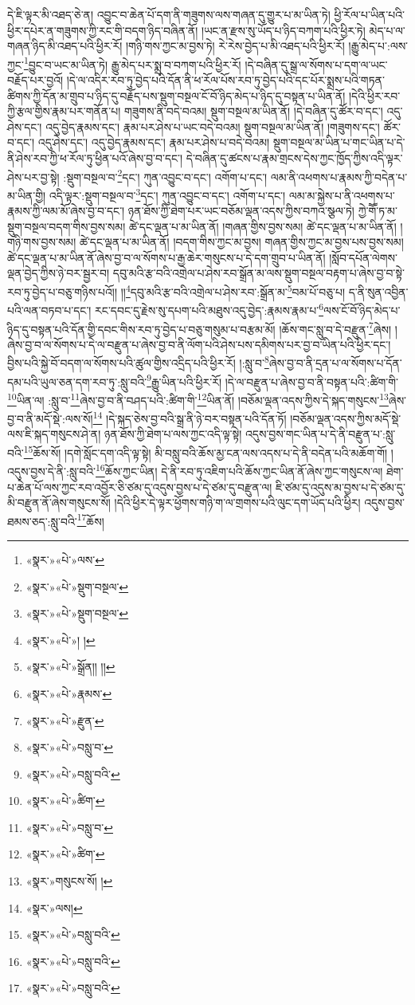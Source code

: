དེ་ཇི་ལྟར་མི་འཐད་ཅེ་ན། འབྱུང་བ་ཆེན་པོ་དག་ནི་གཟུགས་ལས་གཞན་དུ་གྱུར་པ་མ་ཡིན་ཏེ། ཕྱི་རོལ་པ་ཡིན་པའི་ཕྱིར་དཔེར་ན་གཟུགས་ཀྱི་རང་གི་བདག་ཉིད་བཞིན་ནོ། །ཡང་ན་རྫས་སུ་ཡོད་པ་ཉིད་བཀག་པའི་ཕྱིར་ཏེ། མེད་པ་ལ་གཞན་ཉིད་མི་འཐད་པའི་ཕྱིར་རོ། །གཉི་གས་ཀྱང་མ་བྱས་ཏེ། རེ་རེས་བྱེད་པ་མི་འཐད་པའི་ཕྱིར་རོ། །རྒྱུ་མེད་པ་:ལས་ཀྱང་\footnote{«སྣར་»«པེ་»ལས་}བྱུང་བ་ཡང་མ་ཡིན་ཏེ། རྒྱུ་མེད་པར་སྨྲ་བ་བཀག་པའི་ཕྱིར་རོ། །དེ་བཞིན་དུ་སྒྲ་ལ་སོགས་པ་དག་ལ་ཡང་བརྗོད་པར་བྱའོ། །དེ་ལ་འདིར་རབ་ཏུ་བྱེད་པའི་དོན་ནི་ཕ་རོལ་པོས་རབ་ཏུ་བྱེད་པའི་དང་པོར་སྨྲས་པའི་གཏན་ཚིགས་ཀྱི་དོན་མ་གྲུབ་པ་ཉིད་དུ་བརྗོད་པས་སྡུག་བསྔལ་ངོ་བོ་ཉིད་མེད་པ་ཉིད་དུ་བསྟན་པ་ཡིན་ནོ། །དེའི་ཕྱིར་རབ་ཀྱི་རྩལ་གྱིས་རྣམ་པར་གནོན་པ། གཟུགས་ནི་བདེ་བའམ། སྡུག་བསྔལ་མ་ཡིན་ནོ། །དེ་བཞིན་དུ་ཚོར་བ་དང་། འདུ་ཤེས་དང་། འདུ་བྱེད་རྣམས་དང་། རྣམ་པར་ཤེས་པ་ཡང་བདེ་བའམ། སྡུག་བསྔལ་མ་ཡིན་ནོ། །གཟུགས་དང་། ཚོར་བ་དང་། འདུ་ཤེས་དང་། འདུ་བྱེད་རྣམས་དང་། རྣམ་པར་ཤེས་པ་བདེ་བའམ། སྡུག་བསྔལ་མ་ཡིན་པ་གང་ཡིན་པ་དེ་ནི་ཤེས་རབ་ཀྱི་ཕ་རོལ་ཏུ་ཕྱིན་པའོ་ཞེས་བྱ་བ་དང་། དེ་བཞིན་དུ་ཚངས་པ་རྣམ་གྲངས་དེས་ཀྱང་ཁྱོད་ཀྱིས་འདི་ལྟར་ཤེས་པར་བྱ་སྟེ། :སྡུག་བསྔལ་བ་\footnote{«སྣར་»«པེ་»སྡུག་བསྔལ་}དང་། ཀུན་འབྱུང་བ་དང་། འགོག་པ་དང་། ལམ་ནི་འཕགས་པ་རྣམས་ཀྱི་བདེན་པ་མ་ཡིན་གྱི། འདི་ལྟར་:སྡུག་བསྔལ་བ་\footnote{«སྣར་»«པེ་»སྡུག་བསྔལ་}དང་། ཀུན་འབྱུང་བ་དང་། འགོག་པ་དང་། ལམ་མ་སྐྱེས་པ་ནི་འཕགས་པ་རྣམས་ཀྱི་ལམ་མོ་ཞེས་བྱ་བ་དང་། ཉན་ཐོས་ཀྱི་ཐེག་པར་ཡང་བཅོམ་ལྡན་འདས་ཀྱིས་བཀའ་སྩལ་ཏེ། ཀྱེ་གཽ་ཏ་མ་སྡུག་བསྔལ་བདག་གིས་བྱས་སམ། ཚེ་དང་ལྡན་པ་མ་ཡིན་ནོ། །གཞན་གྱིས་བྱས་སམ། ཚེ་དང་ལྡན་པ་མ་ཡིན་ནོ། །གཉི་གས་བྱས་སམ། ཚེ་དང་ལྡན་པ་མ་ཡིན་ནོ། །བདག་གིས་ཀྱང་མ་བྱས། གཞན་གྱིས་ཀྱང་མ་བྱས་པས་བྱས་སམ། ཚེ་དང་ལྡན་པ་མ་ཡིན་ནོ་ཞེས་བྱ་བ་ལ་སོགས་པ་རྒྱ་ཆེར་གསུངས་པ་དེ་དག་གྲུབ་པ་ཡིན་ནོ། །སློབ་དཔོན་ལེགས་ལྡན་བྱེད་ཀྱིས་ཉེ་བར་སྦྱར་བ། དབུ་མའི་རྩ་བའི་འགྲེལ་པ་ཤེས་རབ་སྒྲོན་མ་ལས་སྡུག་བསྔལ་བརྟག་པ་ཞེས་བྱ་བ་སྟེ་རབ་ཏུ་བྱེད་པ་བཅུ་གཉིས་པའོ།། །།\footnote{«སྣར་»«པེ་»། །}དབུ་མའི་རྩ་བའི་འགྲེལ་པ་ཤེས་རབ་:སྒྲོན་མ་\footnote{«སྣར་»«པེ་»སྒྲོན།། །།}བམ་པོ་བཅུ་པ། ད་ནི་སུན་འབྱིན་པའི་ལན་བཏབ་པ་དང་། རང་དབང་དུ་རྗེས་སུ་དཔག་པའི་མཐུས་འདུ་བྱེད་:རྣམས་རྣམ་པ་\footnote{«སྣར་»«པེ་»རྣམས་}ལས་ངོ་བོ་ཉིད་མེད་པ་ཉིད་དུ་བསྟན་པའི་དོན་གྱི་དབང་གིས་རབ་ཏུ་བྱེད་པ་བཅུ་གསུམ་པ་བརྩམ་མོ། །ཆོས་གང་སླུ་བ་དེ་བརྫུན་\footnote{«སྣར་»«པེ་»རྫུན་}ཞེས། །ཞེས་བྱ་བ་ལ་སོགས་པ་དེ་ལ་བརྫུན་པ་ཞེས་བྱ་བ་ནི་ལོག་པའི་ཤེས་པས་དམིགས་པར་བྱ་བ་ཡིན་པའི་ཕྱིར་དང་། བྱིས་པའི་སྐྱེ་བོ་བདག་ལ་སོགས་པའི་ཚུལ་གྱིས་འདྲིད་པའི་ཕྱིར་རོ། །:སླུ་བ་\footnote{«སྣར་»«པེ་»བསླུ་བ་}ཞེས་བྱ་བ་ནི་དྲན་པ་ལ་སོགས་པ་དོན་དམ་པའི་ཡུལ་ཅན་དག་རབ་ཏུ་:སླུ་བའི་\footnote{«སྣར་»«པེ་»བསླུ་བའི་}རྒྱུ་ཡིན་པའི་ཕྱིར་རོ། །དེ་ལ་བརྫུན་པ་ཞེས་བྱ་བ་ནི་བསྟན་པའི་:ཚིག་གི་\footnote{«སྣར་»«པེ་»ཚིག་}ཡིན་ལ། :སླུ་བ་\footnote{«སྣར་»«པེ་»བསླུ་བ་}ཞེས་བྱ་བ་ནི་བཤད་པའི་:ཚིག་གི་\footnote{«སྣར་»«པེ་»ཚིག་}ཡིན་ནོ། །བཅོམ་ལྡན་འདས་ཀྱིས་དེ་སྐད་གསུངས་\footnote{«སྣར་»གསུངས་སོ། །}ཞེས་བྱ་བ་ནི་མདོ་སྡེ་:ལས་སོ།\footnote{«སྣར་»ལས།} །དེ་སྐད་ཅེས་བྱ་བའི་སྒྲ་ནི་ཉེ་བར་བསྟན་པའི་དོན་ཏོ། །བཅོམ་ལྡན་འདས་ཀྱིས་མདོ་སྡེ་ལས་ཇི་སྐད་གསུངས་ཤེ་ན། ཉན་ཐོས་ཀྱི་ཐེག་པ་ལས་ཀྱང་འདི་ལྟ་སྟེ། འདུས་བྱས་གང་ཡིན་པ་དེ་ནི་བརྫུན་པ་:སླུ་བའི་\footnote{«སྣར་»«པེ་»བསླུ་བའི་}ཆོས་སོ། །དགེ་སློང་དག་འདི་ལྟ་སྟེ། མི་བསླུ་བའི་ཆོས་མྱ་ངན་ལས་འདས་པ་དེ་ནི་བདེན་པའི་མཆོག་གོ། །འདུས་བྱས་དེ་ནི་:སླུ་བའི་\footnote{«སྣར་»«པེ་»བསླུ་བའི་}ཆོས་ཀྱང་ཡིན། དེ་ནི་རབ་ཏུ་འཇིག་པའི་ཆོས་ཀྱང་ཡིན་ནོ་ཞེས་ཀྱང་གསུངས་ལ། ཐེག་པ་ཆེན་པོ་ལས་ཀྱང་རབ་འབྱོར་ཅི་ཙམ་དུ་འདུས་བྱས་པ་དེ་ཙམ་དུ་བརྫུན་ལ། ཇི་ཙམ་དུ་འདུས་མ་བྱས་པ་དེ་ཙམ་དུ་མི་བརྫུན་ནོ་ཞེས་གསུངས་སོ། །དེའི་ཕྱིར་དེ་ལྟར་ཕྱོགས་གཉི་ག་ལ་གྲགས་པའི་ལུང་དག་ཡོད་པའི་ཕྱིར། འདུས་བྱས་ཐམས་ཅད་:སླུ་བའི་\footnote{«སྣར་»«པེ་»བསླུ་བའི་}ཆོས། 